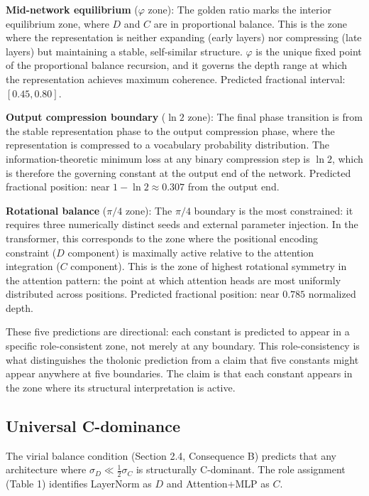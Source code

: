 \documentclass[12pt]{article}
\begin{document}
\textbf{Mid-network equilibrium} (\(\varphi\) zone): The golden ratio
marks the interior equilibrium zone, where \(D\) and \(C\) are in
proportional balance. This is the zone where the representation is
neither expanding (early layers) nor compressing (late layers) but
maintaining a stable, self-similar structure. \(\varphi\) is the unique
fixed point of the proportional balance recursion, and it governs the
depth range at which the representation achieves maximum coherence.
Predicted fractional interval: \([0.45, 0.80]\).

\textbf{Output compression boundary} (\(\ln 2\) zone): The final phase
transition is from the stable representation phase to the output
compression phase, where the representation is compressed to a
vocabulary probability distribution. The information-theoretic minimum
loss at any binary compression step is \(\ln 2\), which is therefore the
governing constant at the output end of the network. Predicted
fractional position: near \(1 - \ln 2 \approx 0.307\) from the output
end.

\textbf{Rotational balance} (\(\pi/4\) zone): The \(\pi/4\) boundary is
the most constrained: it requires three numerically distinct seeds and
external parameter injection. In the transformer, this corresponds to
the zone where the positional encoding constraint (\(D\) component) is
maximally active relative to the attention integration (\(C\)
component). This is the zone of highest rotational symmetry in the
attention pattern: the point at which attention heads are most uniformly
distributed across positions. Predicted fractional position: near
\(0.785\) normalized depth.

These five predictions are directional: each constant is predicted to
appear in a specific role-consistent zone, not merely at any boundary.
This role-consistency is what distinguishes the tholonic prediction from
a claim that five constants might appear anywhere at five boundaries.
The claim is that each constant appears in the zone where its structural
interpretation is active.

\subsection{Universal C-dominance}\label{universal-c-dominance}

The virial balance condition (Section 2.4, Consequence B) predicts that
any architecture where \(\sigma_D \ll \frac{1}{2}\sigma_C\) is
structurally C-dominant. The role assignment (Table 1) identifies
LayerNorm as \(D\) and Attention+MLP as \(C\).
\end{document}
